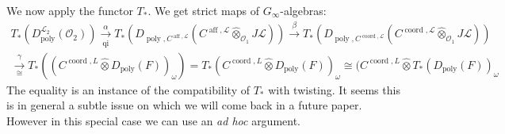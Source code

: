 \documentclass{amsart}
\numberwithin{equation}{section}
\let\cal\mathcal
\theoremstyle{definition}
\theoremstyle{remark}
\begin{document}
We now apply the functor $T_\ast$. We get strict maps of $G_\infty$-algebras:
\begin{multline*}
T_\ast(D_{\operatorname{poly}}^{{{\cal L}}_2}({{\cal O}}_2))\xrightarrow[\text{qi}]{\alpha}
T_\ast(D_{{\operatorname{poly}},C^{{\operatorname{aff}},{{\cal L}}}}(C^{{\operatorname{aff}},{{\cal L}}}{\mathbin{\hat{\otimes}}}_{{{\cal O}}_1} J{{\cal L}}))
\xrightarrow{\beta}
T_\ast(D_{{\operatorname{poly}},C^{{\operatorname{coord}},{{\cal L}}}}(C^{{\operatorname{coord}},{{\cal L}}}{\mathbin{\hat{\otimes}}}_{{{\cal O}}_1} J{{\cal L}}))\\
\xrightarrow[\cong]{\gamma}
T_\ast((C^{{\operatorname{coord}},L} {\mathbin{\hat{\otimes}}} D_{\operatorname{poly}}(F))_{\omega})=
T_\ast(C^{{\operatorname{coord}},L} {\mathbin{\hat{\otimes}}} D_{\operatorname{poly}}(F))_\omega\cong
(C^{{\operatorname{coord}},L}{\mathbin{\hat{\otimes}}} T_\ast(D_{\operatorname{poly}}(F))_\omega
\end{multline*}
The equality is an instance of the compatibility of $T_\ast$ with
twisting.  It seems this is in general a subtle issue on which we will
come back in a future paper. However in this special case we can use
an {\it ad hoc} argument.
\end{document}
